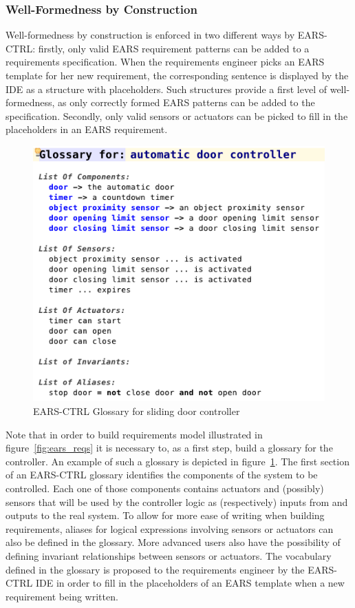 \subsubsection{Well-Formedness by Construction}
Well-formedness by construction is enforced in two different ways by
\textsf{EARS-CTRL}: firstly, only valid EARS requirement patterns can be added
to a requirements specification. When the requirements engineer picks an EARS
template for her new requirement, the corresponding sentence is displayed by the
IDE as a structure with placeholders. Such structures provide a first level of
well-formedness, as only correctly formed EARS patterns can be added to the
specification. Secondly, only valid sensors or actuators can be picked to fill
in the placeholders in an EARS requirement.\vspace{-.5cm}
\begin{figure}[h!]
   \begin{center}
     \includegraphics[width=.5\textwidth]{images/glossary.png}
     \caption{\textsf{EARS-CTRL} Glossary for sliding door
     controller}
     \label{fig:ears_glossary}
   \end{center}
 \end{figure} 
\vspace{-1cm}Note that in order to build requirements model illustrated in
figure~\ref{fig:ears_reqs} it is necessary to, as a first step, build a glossary
for the controller. An example of such a glossary is depicted in
figure~\ref{fig:ears_glossary}. The first section of an \textsf{EARS-CTRL}
glossary identifies the components of the system to be controlled. Each one of
those components contains actuators and (possibly) sensors that will be used by
the controller logic as (respectively) inputs from and outputs to the real
system. To allow for more ease of writing when building requirements, aliases
for logical expressions involving sensors or actuators can also be defined in
the glossary. More advanced users also have the possibility of defining
invariant relationships between sensors or actuators.
The vocabulary defined in the glossary is proposed to the requirements engineer
by the \textsf{EARS-CTRL} IDE in order to fill in the placeholders of an EARS
template when a new requirement being written.

